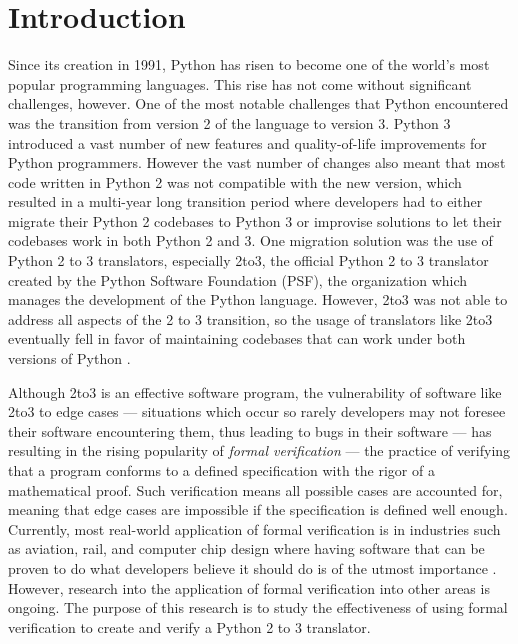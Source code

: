 \section{Introduction}
Since its creation in 1991, Python has risen to become one of the world's most popular programming languages. This rise has not come without significant challenges, however. One of the most notable challenges that Python encountered was the transition from version 2 of the language to version 3. Python 3 introduced a vast number of new features and quality-of-life improvements for Python programmers. However the vast number of changes also meant that most code written in Python 2 was not compatible with the new version, which resulted in a multi-year long transition period where developers had to either migrate their Python 2 codebases to Python 3 or improvise solutions to let their codebases work in both Python 2 and 3. One migration solution was the use of Python 2 to 3 translators, especially 2to3, the official Python 2 to 3 translator created by the Python Software Foundation (PSF), the organization which manages the development of the Python language. However, 2to3 was not able to address all aspects of the 2 to 3 transition, so the usage of translators like 2to3 eventually fell in favor of maintaining codebases that can work under both versions of Python \autocite{Malloy}.

Although 2to3 is an effective software program, the vulnerability of software like 2to3 to edge cases --- situations which occur so rarely developers may not foresee their software encountering them, thus leading to bugs in their software --- has resulting in the rising popularity of \textit{formal verification} --- the practice of verifying that a program conforms to a defined specification with the rigor of a mathematical proof. Such verification means all possible cases are accounted for, meaning that edge cases are impossible if the specification is defined well enough. Currently, most real-world application of formal verification is in industries such as aviation, rail, and computer chip design where having software that can be proven to do what developers believe it should do is of the utmost importance \autocite{Woodcock}. However, research into the application of formal verification into other areas is ongoing. The purpose of this research is to study the effectiveness of using formal verification to create and verify a Python 2 to 3 translator.
